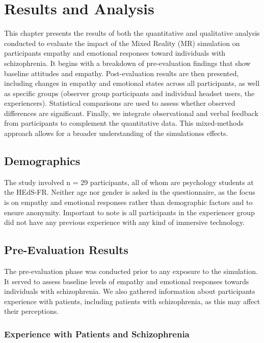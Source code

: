 \chapter{Results and Analysis}
\label{ch:resultsandanalysis}

This chapter presents the results of both the quantitative and qualitative analysis conducted to evaluate the impact of the Mixed Reality (MR) simulation on participants empathy and emotional responses toward individuals with schizophrenia. It begins with a breakdown of pre-evaluation findings that show baseline attitudes and empathy. Post-evaluation results are then presented, including changes in empathy and emotional states across all participants, as well as specific groups (observer group participants and individual headset users, the experiencers). Statistical comparisons are used to assess whether observed differences are significant. Finally, we integrate observational and verbal feedback from participants to complement the quantitative data. This mixed-methods approach allows for a broader understanding of the simulationss effects.

\section{Demographics}
The study involved n = 29 participants, all of whom are psychology students at the HEdS-FR. Neither age nor gender is asked in the questionnaire, as the focus is on empathy and emotional responses rather than demographic factors and to ensure anonymity. Important to note is all participants in the experiencer group did not have any previous experience with any kind of immersive technology.

\section{Pre-Evaluation Results}
The pre-evaluation phase was conducted prior to any exposure to the simulation. It served to assess baseline levels of empathy and emotional responses towards individuals with schizophrenia. We also gathered information about participants experience with patients, including patients with schizophrenia, as this may affect their perceptions.

\subsection{Experience with Patients and Schizophrenia}

